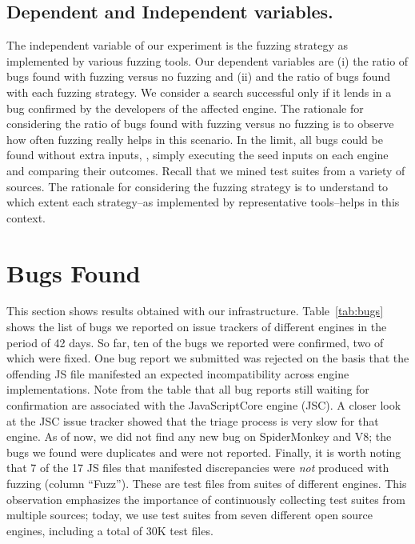 \documentclass[10pt,conference,anonymous]{IEEEtran}
\begin{document}
\subsection{Dependent and Independent variables.}

The independent variable of our experiment is the fuzzing strategy as
implemented by various fuzzing tools. Our dependent variables are (i)
the ratio of bugs found with fuzzing versus no fuzzing and (ii) and
the ratio of bugs found with each fuzzing strategy. We consider a
search successful only if it lends in a bug confirmed by the
developers of the affected engine.  The rationale for considering the
ratio of bugs found with fuzzing versus no fuzzing is to observe how
often fuzzing really helps in this scenario. In the limit, all bugs
could be found without extra inputs, \ie{}, simply executing the seed
inputs on each engine and comparing their outcomes. Recall that we
mined test suites from a variety of sources. The rationale for
considering the fuzzing strategy is to understand to which extent each
strategy--as implemented by representative tools--helps in this
context.

\section{Bugs Found}
\label{sec:results}


This section shows results obtained with our
infrastructure. Table~\ref{tab:bugs} shows the list of bugs we
reported on issue trackers of different engines in the period of 42
days. So far, ten of the bugs we reported
were confirmed, two of which were fixed. One bug report we
submitted was rejected on the basis that the offending JS file
manifested an expected incompatibility across engine
implementations.
Note from the table that all bug
reports still waiting for confirmation are associated with the
JavaScriptCore engine (JSC). A closer look at the JSC issue tracker
showed that the triage process is very slow for that engine. As of
now, we did not find any new bug on SpiderMonkey and V8; the bugs we
found were duplicates and were not reported. Finally, it is
worth noting that 7 of the 17 JS files that manifested
discrepancies were \emph{not} produced with fuzzing (column
``Fuzz''). These are test files from suites of different engines. This
observation emphasizes the importance of continuously collecting test suites from
multiple sources; today, we use test suites from seven different open
source engines, including a total of 30K test files.
\end{document}
